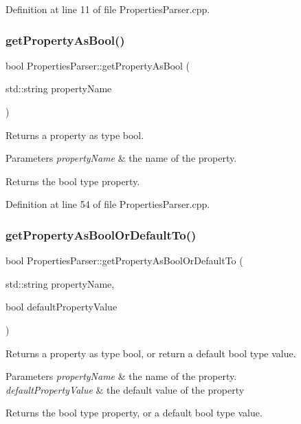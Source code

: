 Definition at line 11 of file Properties\+Parser.\+cpp.

\mbox{\label{class_properties_parser_a8a64ae1f8c21897ea7cd8b02a37dbf9f}} 
\subsubsection{get\+Property\+As\+Bool()}
{\footnotesize\ttfamily bool Properties\+Parser\+::get\+Property\+As\+Bool (\begin{DoxyParamCaption}\item[{std\+::string}]{property\+Name }\end{DoxyParamCaption})}

Returns a property as type bool. 
\begin{DoxyParams}{Parameters}
{\em property\+Name} & the name of the property. \\
\hline
\end{DoxyParams}
\begin{DoxyReturn}{Returns}
the bool type property. 
\end{DoxyReturn}


Definition at line 54 of file Properties\+Parser.\+cpp.

\mbox{\label{class_properties_parser_a47050c9748f17321a60b080f21258b93}} 
\subsubsection{get\+Property\+As\+Bool\+Or\+Default\+To()}
{\footnotesize\ttfamily bool Properties\+Parser\+::get\+Property\+As\+Bool\+Or\+Default\+To (\begin{DoxyParamCaption}\item[{std\+::string}]{property\+Name,  }\item[{bool}]{default\+Property\+Value }\end{DoxyParamCaption})}

Returns a property as type bool, or return a default bool type value. 
\begin{DoxyParams}{Parameters}
{\em property\+Name} & the name of the property. \\
\hline
{\em default\+Property\+Value} & the default value of the property \\
\hline
\end{DoxyParams}
\begin{DoxyReturn}{Returns}
the bool type property, or a default bool type value. 
\end{DoxyReturn}


